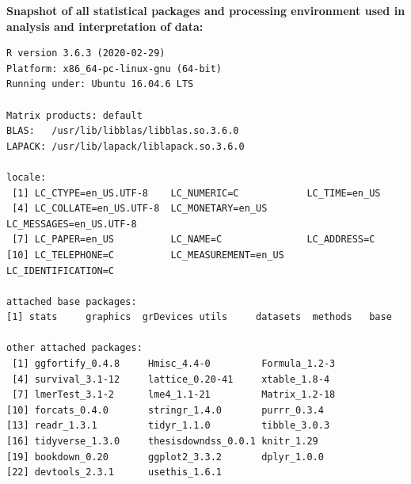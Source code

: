 \documentclass[12pt,oneside]{dukestatscithesis} %
\begin{document}
\textbf{Snapshot of all statistical packages and processing environment used in analysis and interpretation of data:}
\begin{verbatim}
R version 3.6.3 (2020-02-29)
Platform: x86_64-pc-linux-gnu (64-bit)
Running under: Ubuntu 16.04.6 LTS

Matrix products: default
BLAS:   /usr/lib/libblas/libblas.so.3.6.0
LAPACK: /usr/lib/lapack/liblapack.so.3.6.0

locale:
 [1] LC_CTYPE=en_US.UTF-8    LC_NUMERIC=C            LC_TIME=en_US          
 [4] LC_COLLATE=en_US.UTF-8  LC_MONETARY=en_US       LC_MESSAGES=en_US.UTF-8
 [7] LC_PAPER=en_US          LC_NAME=C               LC_ADDRESS=C           
[10] LC_TELEPHONE=C          LC_MEASUREMENT=en_US    LC_IDENTIFICATION=C    

attached base packages:
[1] stats     graphics  grDevices utils     datasets  methods   base     

other attached packages:
 [1] ggfortify_0.4.8     Hmisc_4.4-0         Formula_1.2-3      
 [4] survival_3.1-12     lattice_0.20-41     xtable_1.8-4       
 [7] lmerTest_3.1-2      lme4_1.1-21         Matrix_1.2-18      
[10] forcats_0.4.0       stringr_1.4.0       purrr_0.3.4        
[13] readr_1.3.1         tidyr_1.1.0         tibble_3.0.3       
[16] tidyverse_1.3.0     thesisdowndss_0.0.1 knitr_1.29         
[19] bookdown_0.20       ggplot2_3.3.2       dplyr_1.0.0        
[22] devtools_2.3.1      usethis_1.6.1      


\end{verbatim}
\end{document}
